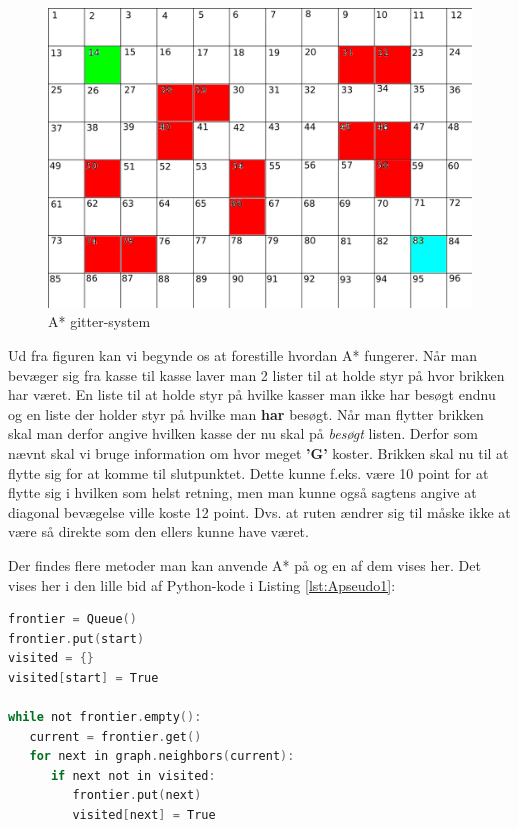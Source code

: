 \begin{figure}[ht!]
\begin{adjustbox}{width=1.2\textwidth,center=\textwidth}
\centering
\includegraphics[width=1.2\textwidth]{Pictures/Teoriafsnit/Figurfiler/Grid2.png}
\end{adjustbox}
\label{fig:AKvadrat1}
\caption{A* gitter-system}
\end{figure}

Ud fra figuren kan vi begynde os at forestille hvordan A* fungerer. Når man bevæger sig fra kasse til kasse laver man 2 lister til at holde styr på hvor brikken har været. En liste til at holde styr på hvilke kasser man ikke har besøgt endnu og en liste der holder styr på hvilke man \textbf{har} besøgt. Når man flytter brikken skal man derfor angive hvilken kasse der nu skal på \textit{besøgt} listen. Derfor som nævnt skal vi bruge information om hvor meget \textbf{'G'} koster. Brikken skal nu til at flytte sig for at komme til slutpunktet. Dette kunne f.eks. være 10 point for at flytte sig i hvilken som helst retning, men man kunne også sagtens angive at diagonal bevægelse ville koste 12 point. Dvs. at ruten ændrer sig til måske ikke at være så direkte som den ellers kunne have været.

Der findes flere metoder man kan anvende A* på og en af dem vises her.
Det vises her i den lille bid af Python-kode i Listing \ref{lst:Apseudo1}:
\begin{lstlisting}[caption={A stjerne og pseudo-kode af brug af lister},label={lst:Apseudo1},language=C]
frontier = Queue()
frontier.put(start)
visited = {}
visited[start] = True

while not frontier.empty():
   current = frontier.get()
   for next in graph.neighbors(current):
      if next not in visited:
         frontier.put(next)
         visited[next] = True
\end{lstlisting}
\cite{stanfordredblobgamesAstar}

